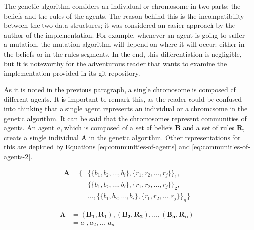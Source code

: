The genetic algorithm considers an individual or chromosome in two parts: the
beliefs and the rules of the agents. The reason behind this is the
incompatibility between the two data structures; it was considered an easier
approach by the author of the implementation. For example, whenever an agent is
going to suffer a mutation, the mutation algorithm will depend on where it will
occur: either in the beliefs or in the rules segments. In the end, this
differentiation is negligible, but it is noteworthy for the adventurous reader
that wants to examine the implementation provided in its git repository.

As it is noted in the previous paragraph, a single chromosome is composed of
different agents. It is important to remark this, as the reader could be
confused into thinking that a single agent represents an individual or a
chromosome in the genetic algorithm. It can be said that the chromosomes
represent communities of agents. An agent $a$, which is composed
of a set of beliefs $\bm{B}$ and a set of rules $\bm{R}$, create a single
individual $\bm{A}$ in the genetic algorithm. Other representations for this are
depicted by Equations \ref{eq:communities-of-agents} and \ref{eq:communities-of-agents-2}.

\begin{equation}
  \label{eq:communities-of-agents}
  \begin{split}
    \bm{A} = \{&\{\{b_1, b_2, \ldots, b_i\}, \{r_1, r_2, \ldots, r_j\}\}_1, \\
               &\{\{b_1, b_2, \ldots, b_i\}, \{r_1, r_2, \ldots, r_j\}\}_2, \\
               &\ldots, \{\{b_1, b_2, \ldots, b_i\}, \{r_1, r_2, \ldots, r_j\}\}_n\}
  \end{split}
\end{equation}

\begin{equation}
  \label{eq:communities-of-agents-2}
  \begin{split}
    \bm{A} &= {(\bm{B_{1}}, \bm{R_{1}}), (\bm{B_{2}}, \bm{R_{2}}), \ldots, (\bm{B_{n}}, \bm{R_{n}})} \\
           &= {a_{1}, a_{2}, \dots, a_{n}}
  \end{split}
\end{equation}



